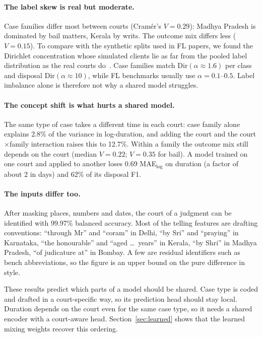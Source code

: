 \documentclass[11pt,a4paper]{article}
\newcommand{\mae}{MAE$_{\log}$}
\begin{document}
\paragraph{The label skew is real but moderate.} Case families differ most between courts (Cram\'er's
$V=0.29$): Madhya Pradesh is dominated by bail matters, Kerala by writs. The outcome mix differs less
($V=0.15$). To compare with the synthetic splits used in FL papers, we found the Dirichlet
concentration whose simulated clients lie as far from the pooled label distribution as the real courts
do~\cite{hsu2019fedavgm}. Case families match $\mathrm{Dir}(\alpha\approx1.6)$ per class and disposal
$\mathrm{Dir}(\alpha\approx10)$, while FL benchmarks usually use $\alpha=0.1$--$0.5$. Label imbalance
alone is therefore not why a shared model struggles.

\paragraph{The concept shift is what hurts a shared model.} The same type of case takes a different
time in each court: case family alone explains 2.8\% of the variance in log-duration, and adding the
court and the court$\times$family interaction raises this to 12.7\%. Within a family the outcome mix
still depends on the court (median $V=0.22$; $V=0.35$ for bail). A model trained on one court and
applied to another loses 0.69 \mae{} on duration (a factor of about 2 in days) and 62\% of its
disposal F1.

\paragraph{The inputs differ too.} After masking places, numbers and dates, the court of a judgment can
be identified with 99.97\% balanced accuracy. Most of the telling features are drafting conventions:
``through Mr'' and ``coram'' in Delhi, ``by Sri'' and ``praying'' in Karnataka, ``the honourable'' and
``aged \ldots\ years'' in Kerala, ``by Shri'' in Madhya Pradesh, ``of judicature at'' in Bombay. A few
are residual identifiers such as bench abbreviations, so the figure is an upper bound on the pure
difference in style.

These results predict which parts of a model should be shared. Case type is coded and drafted in a
court-specific way, so its prediction head should stay local. Duration depends on the court even for
the same case type, so it needs a shared encoder with a court-aware head. Section~\ref{sec:learned}
shows that the learned mixing weights recover this ordering.
\end{document}
